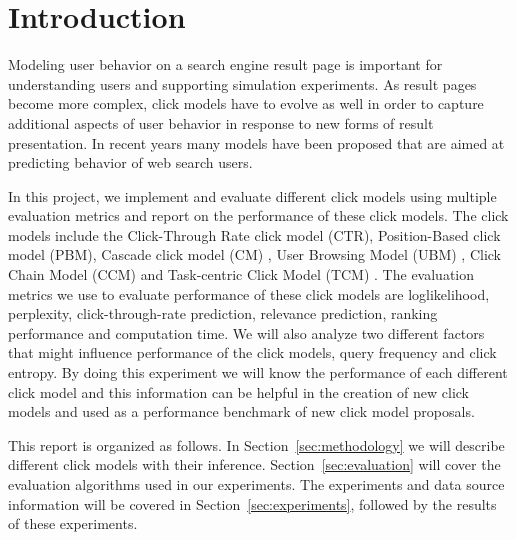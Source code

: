 \section{Introduction}
Modeling user behavior on a search engine result page is important for understanding users and supporting simulation experiments.
As result pages become more complex, click models have to evolve as well in order to capture additional aspects of user behavior in response to new forms of result presentation.
In recent years many models have been proposed that are aimed at predicting behavior of web search users. 

In this project, we implement and evaluate different click models using multiple evaluation metrics and report on the performance of these click models.
The click models include the Click-Through Rate click model (CTR), Position-Based click model (PBM), Cascade click model (CM) \cite{Kempe2008}, User Browsing Model (UBM) \cite{Dupret2008}, Click Chain Model (CCM) \cite{Guo2009_CCM} and Task-centric Click Model (TCM) \cite{Zhang2011}.
The evaluation metrics we use to evaluate performance of these click models are loglikelihood, perplexity, click-through-rate prediction, relevance prediction, ranking performance and computation time. We will also analyze two different factors that might influence performance of the click models, query frequency and click entropy.
By doing this experiment we will know the performance of each different click model and this information can be helpful in the creation of new click models and used as a performance benchmark of new click model proposals.

This report is organized as follows.
In Section~\ref{sec:methodology} we will describe different click models with their inference. Section~\ref{sec:evaluation} will cover the evaluation algorithms used in our experiments. The experiments and data source information will be covered in Section~\ref{sec:experiments}, followed by the results of these experiments.
